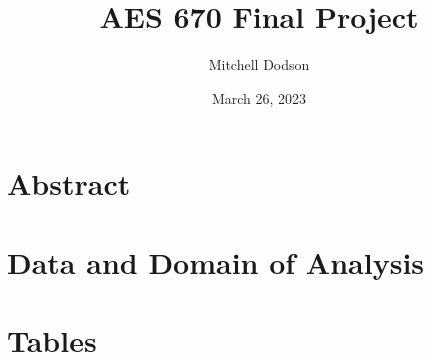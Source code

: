 \documentclass[12pt]{article}
\title{AES 670 Final Project}
\author{Mitchell Dodson}
\date{March 26, 2023}
\begin{document}
\maketitle

\vspace{5em}

\section{Abstract}

\section{Data and Domain of Analysis}

\section{Tables}


\clearpage
\end{document}
